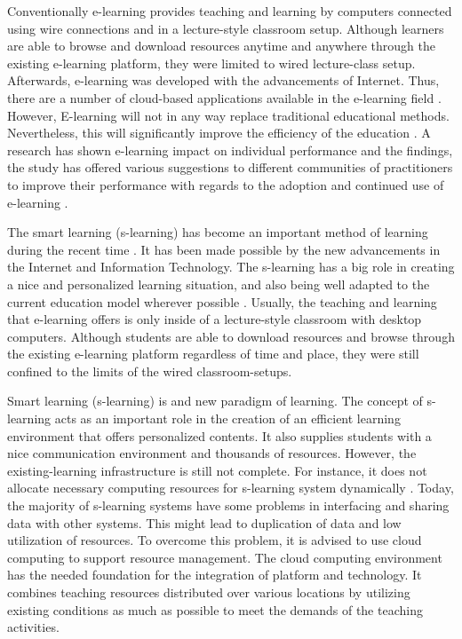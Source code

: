 \documentclass[journal]{vgtc}
\begin{document}
Conventionally e-learning provides teaching and learning by computers connected using wire connections and in a lecture-style classroom setup. Although learners are able to browse and download resources anytime and anywhere through the existing e-learning platform, they were limited to wired lecture-class setup. Afterwards, e-learning was developed with the advancements of Internet. Thus, there are a number of cloud-based applications available in the e-learning field \cite{s110807835}. However, E-learning will not in any way replace traditional educational methods. Nevertheless, this will significantly improve the efficiency of the education \cite{SudhirKumarSharmaNidhiGoyal2014}. A research has shown e-learning impact on individual performance and the findings, the study has offered various suggestions to different communities of practitioners to improve their performance with regards to the adoption and continued use of e-learning \cite{Mohammadyari2014}.

The smart learning (s-learning) has become an important method of learning during the recent time \cite{Kim2013}. It has been made possible by the new advancements in the Internet and Information Technology. The s-learning has a big role in creating a nice and personalized learning situation, and also being well adapted to the current education model wherever possible \cite{Uden2007}. Usually, the teaching and learning that e-learning offers is only inside of a lecture-style classroom with desktop computers. Although students are able to download resources and browse through the existing e-learning platform regardless of time and place, they were still confined to the limits of the wired classroom-setups.

Smart learning (s-learning) is and new paradigm of learning. The concept of s-learning acts as an important role in the creation of an efficient learning environment that offers personalized contents. It also supplies students with a nice communication environment and thousands of resources. However, the existing-learning infrastructure is still not complete. For instance, it does not allocate necessary computing resources for s-learning system dynamically \cite{Uden2007}. Today, the majority of s-learning systems have some problems in interfacing and sharing data with other systems. This might lead to duplication of data and low utilization of resources. To overcome this problem, it is advised to use cloud computing to support resource management. The cloud computing environment has the needed foundation for the integration of platform and technology. It combines teaching resources distributed over various locations by utilizing existing conditions as much as possible to meet the demands of the teaching activities.
\end{document}
